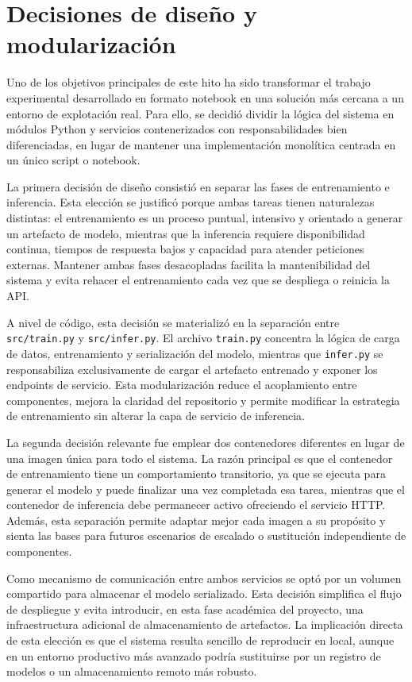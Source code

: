 \section{Decisiones de dise\~no y modularizaci\'on}

Uno de los objetivos principales de este hito ha sido transformar el trabajo experimental desarrollado en formato notebook en una soluci\'on
m\'as cercana a un entorno de explotaci\'on real. Para ello, se decidi\'o dividir la l\'ogica del sistema en m\'odulos Python y servicios
contenerizados con responsabilidades bien diferenciadas, en lugar de mantener una implementaci\'on monol\'itica centrada en un \'unico
script o notebook.

La primera decisi\'on de dise\~no consisti\'o en separar las fases de entrenamiento e inferencia. Esta elecci\'on se justific\'o porque ambas
tareas tienen naturalezas distintas: el entrenamiento es un proceso puntual, intensivo y orientado a generar un artefacto de modelo, mientras
que la inferencia requiere disponibilidad continua, tiempos de respuesta bajos y capacidad para atender peticiones externas. Mantener ambas
fases desacopladas facilita la mantenibilidad del sistema y evita rehacer el entrenamiento cada vez que se despliega o reinicia la API.

A nivel de c\'odigo, esta decisi\'on se materializ\'o en la separaci\'on entre \texttt{src/train.py} y \texttt{src/infer.py}. El archivo
\texttt{train.py} concentra la l\'ogica de carga de datos, entrenamiento y serializaci\'on del modelo, mientras que \texttt{infer.py}
se responsabiliza exclusivamente de cargar el artefacto entrenado y exponer los endpoints de servicio. Esta modularizaci\'on reduce el
acoplamiento entre componentes, mejora la claridad del repositorio y permite modificar la estrategia de entrenamiento sin alterar la capa
de servicio de inferencia.

La segunda decisi\'on relevante fue emplear dos contenedores diferentes en lugar de una imagen \'unica para todo el sistema. La raz\'on
principal es que el contenedor de entrenamiento tiene un comportamiento transitorio, ya que se ejecuta para generar el modelo y puede
finalizar una vez completada esa tarea, mientras que el contenedor de inferencia debe permanecer activo ofreciendo el servicio HTTP.
Adem\'as, esta separaci\'on permite adaptar mejor cada imagen a su prop\'osito y sienta las bases para futuros escenarios de escalado
o sustituci\'on independiente de componentes.

Como mecanismo de comunicaci\'on entre ambos servicios se opt\'o por un volumen compartido para almacenar el modelo serializado. Esta
decisi\'on simplifica el flujo de despliegue y evita introducir, en esta fase acad\'emica del proyecto, una infraestructura adicional de
almacenamiento de artefactos. La implicaci\'on directa de esta elecci\'on es que el sistema resulta sencillo de reproducir en local, aunque
en un entorno productivo m\'as avanzado podr\'ia sustituirse por un registro de modelos o un almacenamiento remoto m\'as robusto.

